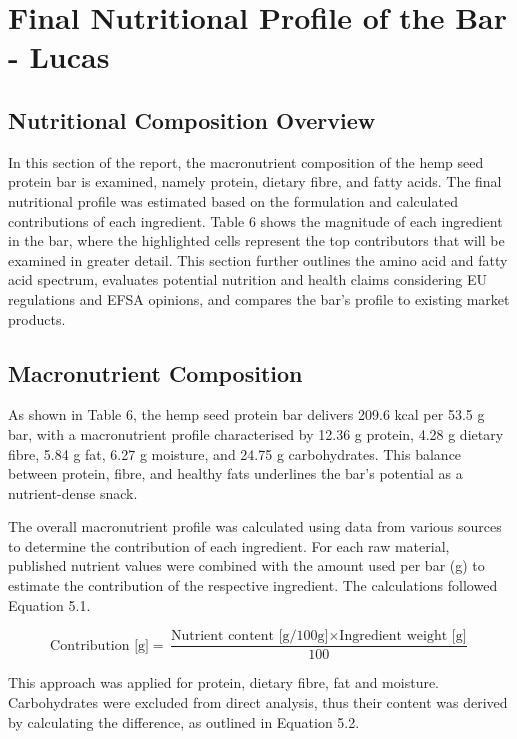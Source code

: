 \chapter{Final Nutritional Profile of the Bar - Lucas}
\setlength{\headheight}{12.71342pt}
\addtolength{\topmargin}{-0.71342pt}


\section{Nutritional Composition Overview}
In this section of the report, the macronutrient composition of the hemp seed protein bar is examined, namely protein, dietary fibre, and fatty acids. The final nutritional profile was estimated based on the formulation and calculated contributions of each ingredient. Table 6 shows the magnitude of each ingredient in the bar, where the highlighted cells represent the top contributors that will be examined in greater detail. This section further outlines the amino acid and fatty acid spectrum, evaluates potential nutrition and health claims considering EU regulations and EFSA opinions, and compares the bar’s profile to existing market products.

\section{Macronutrient Composition}
As shown in Table 6, the hemp seed protein bar delivers 209.6 kcal per 53.5 g bar, with a macronutrient profile characterised by 12.36 g protein, 4.28 g dietary fibre, 5.84 g fat, 6.27 g moisture, and 24.75 g carbohydrates. This balance between protein, fibre, and healthy fats underlines the bar’s potential as a nutrient-dense snack.

\vspace{1em}
The overall macronutrient profile was calculated using data from various sources to determine the contribution of each ingredient. For each raw material, published nutrient values were combined with the amount used per bar (g) to estimate the contribution of the respective ingredient. The calculations followed Equation 5.1. 


\begin{equation}
    \text{Contribution [g]} = 
    \frac{\text{Nutrient content [g/100g]} \times \text{Ingredient weight [g]}}{100}
    \label{eq:contribution}
\end{equation}

This approach was applied for protein, dietary fibre, fat and moisture. Carbohydrates were excluded from direct analysis, thus their content was derived by calculating the difference, as outlined in Equation 5.2. 

